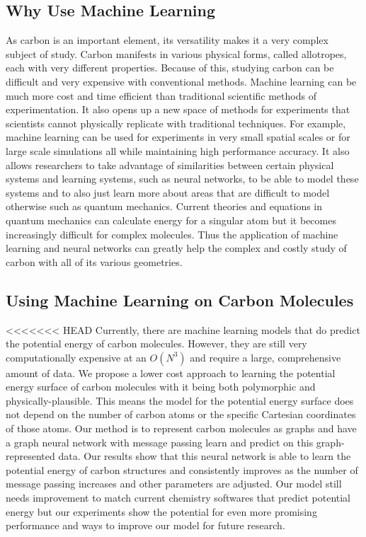 \documentclass[12pt, abstract = true]{scrartcl}
\begin{document}
\subsection{Why Use Machine Learning}
As carbon is an important element, its versatility makes it a very
complex subject of study. Carbon manifests in various physical forms,
called allotropes, each with very different properties. Because of
this, studying carbon can be difficult and very expensive with conventional
methods. Machine learning can be much more cost and time efficient than traditional
scientific methods of experimentation. It also opens up a new space of methods for 
experiments that scientists cannot physically replicate with traditional techniques. 
For example, machine learning can be used for experiments in very small spatial
scales or for large scale simulations all while maintaining high
performance accuracy. It also allows researchers to take advantage of similarities 
between certain physical systems and learning systems, such as neural networks, to be 
able to model these systems and to also just learn more about areas that are difficult 
to model otherwise such as quantum mechanics. Current theories and equations in quantum 
mechanics can calculate energy for a singular atom but it becomes increasingly difficult 
for complex molecules. Thus the application of machine learning and neural networks 
can greatly help the complex and costly study of carbon with all of its various geometries.

\subsection{Using Machine Learning on Carbon Molecules}
<<<<<<< HEAD
Currently, there are machine learning models that do predict the potential energy of carbon molecules. However, they are still very computationally expensive at an $O(N^3)$ and require a large, comprehensive amount of data. We propose a lower cost approach to learning the potential energy surface of carbon molecules with it being both polymorphic and physically-plausible. This means the model for the potential energy surface does not depend on the number of carbon atoms or the specific Cartesian coordinates of those atoms. Our method is to represent carbon molecules as graphs and have a graph neural network with message passing learn and predict on this graph-represented data. Our results show that this neural network is able to learn the potential energy of carbon structures and consistently improves as the number of message passing increases and other parameters are adjusted. Our model still needs improvement to match current chemistry softwares that predict potential energy but our experiments show the potential for even more promising performance and ways to improve our model for future research.
\end{document}
